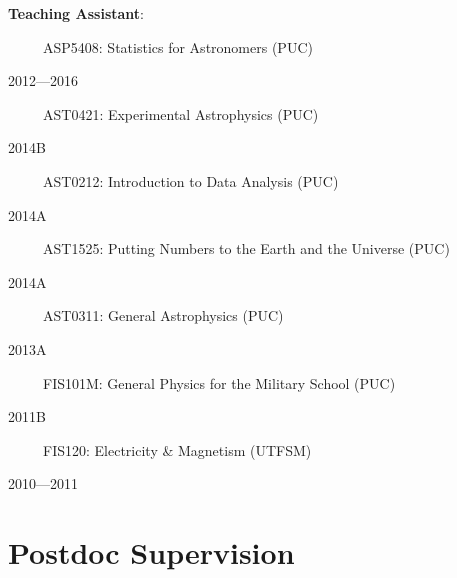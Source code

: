 \documentclass[12pt, a4paper]{article} %
\begin{document}
\begin{flushleft}%
  \setlength{\leftskip}{0.2cm}%
\textbf{Teaching Assistant}:
\end{flushleft}
\begin{minipage}[t]{0.6\textwidth}
\ \ \ \ \ ASP5408: Statistics for Astronomers (PUC)
\end{minipage}
\begin{minipage}[t]{0.4\textwidth}
\hfill 2012---2016
\end{minipage}
\begin{minipage}[t]{0.7\textwidth}
\ \ \ \ \ AST0421: Experimental Astrophysics (PUC)
\end{minipage}
\begin{minipage}[t]{0.3\textwidth}
\hfill 2014B
\end{minipage}
\begin{minipage}[t]{0.7\textwidth}
\ \ \ \ \ AST0212: Introduction to Data Analysis (PUC)
\end{minipage}
\begin{minipage}[t]{0.3\textwidth}
\hfill 2014A
\end{minipage}
\begin{minipage}[t]{0.7\textwidth}
\ \ \ \ \ AST1525: Putting Numbers to the Earth and the Universe (PUC)
\end{minipage}
\begin{minipage}[t]{0.3\textwidth}
\hfill 2014A
\end{minipage}
\begin{minipage}[t]{0.7\textwidth}
\ \ \ \ \ AST0311: General Astrophysics (PUC)
\end{minipage}
\begin{minipage}[t]{0.3\textwidth}
\hfill 2013A
\end{minipage}
\begin{minipage}[t]{0.7\textwidth}
\ \ \ \ \ FIS101M: General Physics for the Military School (PUC)
\end{minipage}
\begin{minipage}[t]{0.3\textwidth}
\hfill 2011B
\end{minipage}
\begin{minipage}[t]{0.7\textwidth}
\ \ \ \ \ FIS120: Electricity \& Magnetism (UTFSM)
\end{minipage}
\begin{minipage}[t]{0.3\textwidth}
\hfill 2010---2011
\end{minipage}


\section*{Postdoc Supervision}
\end{document}
